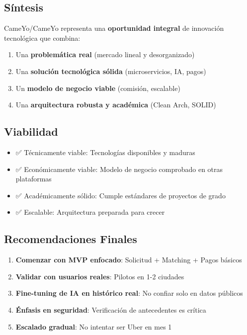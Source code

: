 \documentclass[12pt,a4paper,spanish]{article}
\begin{document}
\subsection{Síntesis}

CameYo/CameYo representa una \textbf{oportunidad integral} de innovación tecnológica que combina:

\begin{enumerate}
    \item Una \textbf{problemática real} (mercado lineal y desorganizado)
    \item Una \textbf{solución tecnológica sólida} (microservicios, IA, pagos)
    \item Un \textbf{modelo de negocio viable} (comisión, escalable)
    \item Una \textbf{arquitectura robusta y académica} (Clean Arch, SOLID)
\end{enumerate}

\subsection{Viabilidad}

\begin{itemize}
    \item ✅ Técnicamente viable: Tecnologías disponibles y maduras
    \item ✅ Económicamente viable: Modelo de negocio comprobado en otras plataformas
    \item ✅ Académicamente sólido: Cumple estándares de proyectos de grado
    \item ✅ Escalable: Arquitectura preparada para crecer
\end{itemize}

\subsection{Recomendaciones Finales}

\begin{enumerate}
    \item \textbf{Comenzar con MVP enfocado}: Solicitud + Matching + Pagos básicos
    \item \textbf{Validar con usuarios reales}: Pilotos en 1-2 ciudades
    \item \textbf{Fine-tuning de IA en histórico real}: No confiar solo en datos públicos
    \item \textbf{Énfasis en seguridad}: Verificación de antecedentes es crítica
    \item \textbf{Escalado gradual}: No intentar ser Uber en mes 1
\end{enumerate}
\end{document}
